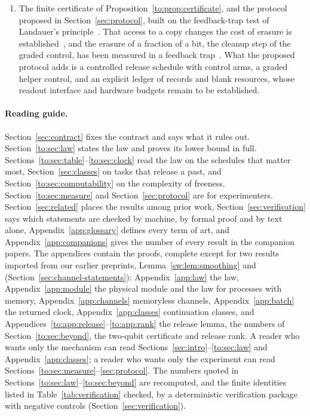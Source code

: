 \begin{enumerate}[label=(\arabic*),leftmargin=*,itemsep=1pt,topsep=2pt]
\item The finite certificate of Proposition~\ref{to:prop:certificate}, and the protocol proposed in Section~\ref{sec:protocol}, built on the feedback-trap test of Landauer's principle~\cite{Jun14}. That access to a copy changes the cost of erasure is established~\cite{Bennett03,delRio11,Orlov12}, and the erasure of a fraction of a bit, the cleanup step of the graded control, has been measured in a feedback trap~\cite{Gavrilov17}. What the proposed protocol adds is a controlled release schedule with control arms, a graded helper control, and an explicit ledger of records and blank resources, whose readout interface and hardware budgets remain to be established.
\end{enumerate}

\paragraph{Reading guide.} Section~\ref{sec:contract} fixes the contract and says what it rules out. Section~\ref{to:sec:law} states the law and proves its lower bound in full. Sections~\ref{to:sec:table}--\ref{to:sec:clock} read the law on the schedules that matter most, Section~\ref{sec:classes} on tasks that release a past, and Section~\ref{to:sec:computability} on the complexity of freeness. Section~\ref{to:sec:measure} and Section~\ref{sec:protocol} are for experimenters. Section~\ref{sec:related} places the results among prior work, Section~\ref{sec:verification} says which statements are checked by machine, by formal proof and by text alone, Appendix~\ref{app:glossary} defines every term of art, and Appendix~\ref{app:companions} gives the number of every result in the companion papers. The appendices contain the proofs, complete except for two results imported from our earlier preprints, Lemma~\ref{sw:lem:smoothing} and~\cite[Thm.~3.2(a)]{Memory} (Section~\ref{sec:channel-statements}): Appendix~\ref{app:law} the law, Appendix~\ref{app:module} the physical module and the law for processes with memory, Appendix~\ref{app:channels} memoryless channels, Appendix~\ref{app:batch} the returned clock, Appendix~\ref{app:classes} continuation classes, and Appendices~\ref{to:app:release}--\ref{to:app:rank} the release lemma, the numbers of Section~\ref{to:sec:beyond}, the two-qubit certificate and release rank. A reader who wants only the mechanism can read Sections~\ref{sec:intro}--\ref{to:sec:law} and Appendix~\ref{app:classes}; a reader who wants only the experiment can read Sections~\ref{to:sec:measure}--\ref{sec:protocol}. The numbers quoted in Sections~\ref{to:sec:law}--\ref{to:sec:beyond} are recomputed, and the finite identities listed in Table~\ref{tab:verification} checked, by a deterministic verification package with negative controls (Section~\ref{sec:verification}).

